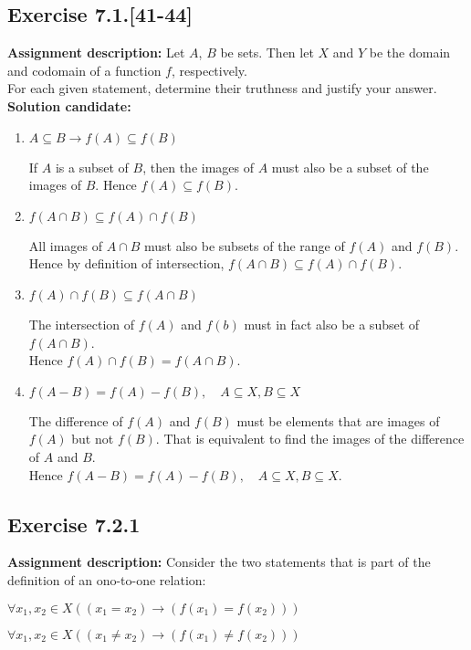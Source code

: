 \documentclass{report}
\newcommand{\cent}[1]{\begin{center}#1\end{center}}
\newcommand{\In}{\! \in \!}
\newcommand{\AssignmentDescription}{\textbf{Assignment description: }}
\newcommand{\Solution}{\textbf{Solution candidate: }}
\newcommand{\Exercise}[1]{\subsection{Exercise #1}}
\newcommand{\defaultEnumerateLabel}{\textbf{\alph*.}}
\begin{document}
 	\Exercise{7.1.[41-44]}
 	
 	\AssignmentDescription
 	Let $A$, $B$ be sets. Then let $X$ and $Y$ be the domain and codomain of a function $f$, respectively.\\
 	
 	For each given statement, determine their truthness and justify your answer.\\
 	
 	\Solution
 	\begin{enumerate}[label=\defaultEnumerateLabel]
 		\item $A\subseteq B \to f(A) \subseteq f(B)$
 		
 		If $A$ is a subset of $B$, then the images of $A$ must also be a subset of the images of $B$. Hence $f(A) \subseteq f(B)$.
 		
 		\item $f(A \cap B) \subseteq f(A) \cap f(B)$
 		
 		All images of $A \cap B$ must also be subsets of the range of $f(A)$ and $f(B)$.\\ 
 		
 		Hence by definition of intersection, $f(A \cap B) \subseteq f(A) \cap f(B)$.\\
 		\item $f(A) \cap f(B) \subseteq f(A \cap B)$
 		
 		The intersection of $f(A)$ and $f(b)$ must in fact also be a subset of $f(A \cap B)$.\\
 		
 		Hence $f(A) \cap f(B) = f(A \cap B)$.
 		
 		\item $ f(A-B) = f(A) - f(B), \quad A \subseteq X, B \subseteq X $
 		
 		The difference of $ f(A) $ and $f(B)$ must be elements that are images of $f(A)$ but not $f(B)$. That is equivalent to find the images of the difference of $A$ and $B$.\\ 
 		
 		Hence  $ f(A-B) = f(A) - f(B), \quad A \subseteq X, B \subseteq X $.
 	\end{enumerate}
 	
 	\Exercise{7.2.1}
 	
 	\AssignmentDescription
 	Consider the two statements that is part of the definition of an ono-to-one relation:
 	
 	\cent{$\forall x_1, x_2 \In X ((x_1 = x_2) \to (f(x_1) = f(x_2) ))$}
 	\cent{$\forall x_1, x_2 \In X ((x_1 \neq x_2) \to (f(x_1) \neq f(x_2)))$}
 	
\end{document}
